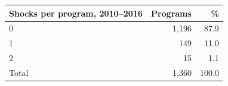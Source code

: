 \begin{tabular}{lrr}
\toprule
Shocks per program, 2010--2016 & Programs & \% \\
\midrule
0 &     1,196 &  87.9 \\
1 &       149 &  11.0 \\
2 &        15 &   1.1 \\
\midrule
Total &     1,360 & 100.0 \\
\bottomrule
\end{tabular}

